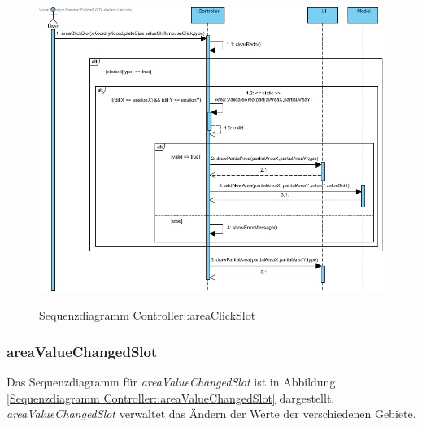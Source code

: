 \begin{figure}[H]
	\centering
	\includegraphics[scale=.5]{Bilder/Controller__areaClickSlot().jpg}\\
	\caption{Sequenzdiagramm Controller::areaClickSlot}
	\label{Sequenzdiagramm Controller::areaClickSlot}
\end{figure}

\subsubsection*{areaValueChangedSlot}

Das Sequenzdiagramm für \emph{areaValueChangedSlot} ist in Abbildung \ref{Sequenzdiagramm Controller::areaValueChangedSlot} dargestellt. \emph{areaValueChangedSlot} verwaltet das Ändern der Werte der verschiedenen Gebiete.

